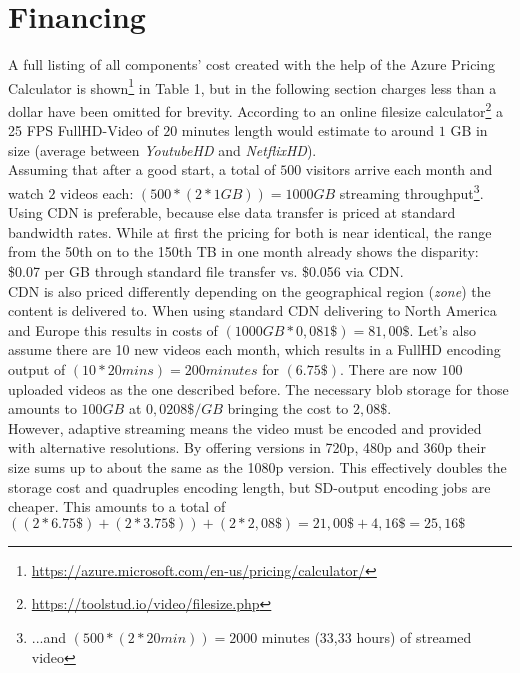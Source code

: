 \section{Financing}\label{sec:ch5}
A full listing of all components' cost created with the help of the Azure Pricing Calculator is shown\footnote{\url{https://azure.microsoft.com/en-us/pricing/calculator/}} in Table 1, but in the following section charges less than a dollar have been omitted for brevity.
According to an online filesize calculator\footnote{\url{https://toolstud.io/video/filesize.php}} a 25 FPS FullHD-Video 
of $20$ minutes length would estimate to around $1$ GB in size (average between 
\textit{YoutubeHD} and \textit{NetflixHD}).\\ %
Assuming that after a good start, a total of $500$ visitors arrive each month and watch $2$ videos each: 
$(500 \ast (2 \ast 1 GB)) = 1000GB$ streaming throughput\footnote{...and $(500 \ast (2 \ast 20 min)) = 
2000$ minutes (33,33 hours) of streamed video}. 
Using CDN is preferable, because else data transfer is priced at standard bandwidth rates.
While at first the pricing for both is near identical, the range from the 
50th on to the 150th TB in one month already shows the disparity: \$0.07 
per GB through standard file transfer vs. \$0.056 via CDN. \\
CDN is also priced differently depending on the geographical region (\textit{zone}) the content is delivered to.
When using standard CDN delivering to North America and Europe
this results in costs of $(1000GB * 0,081\$ ) = 81,00\$$. Let's also assume
there are 10 new videos each month, which results in a FullHD encoding output of 
$(10 \ast 20 mins) = 200 minutes$ for $(6.75\$)$. There are now $100$ uploaded videos as the one described 
before. The necessary blob storage for those amounts to $100GB$ at $0,0208\$/GB$ bringing the cost to $2,08\$$.\\
However, adaptive streaming means the video must be encoded and provided with alternative resolutions. By offering versions
in 720p, 480p and 360p their size sums up to about the same as the 1080p version. This effectively doubles the storage cost and quadruples encoding length, but SD-output encoding jobs are cheaper. This amounts to a total of $((2\ast 6.75\$ ) + (2 \ast 3.75\$)) + (2 \ast 2,08\$ ) = 21,00\$ + 4,16\$ = 25,16\$$

